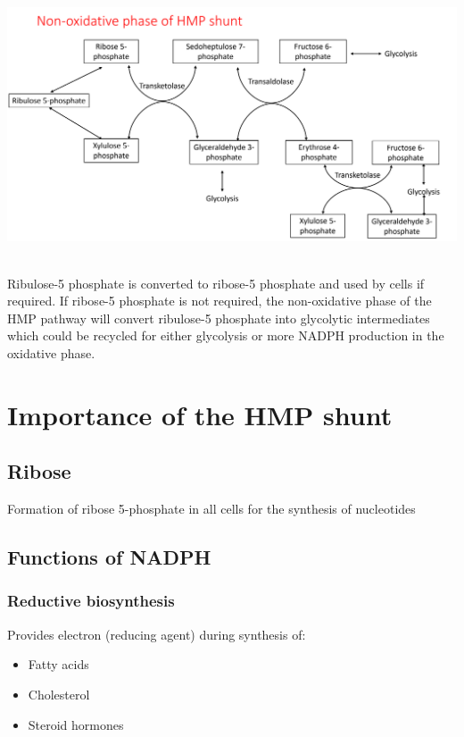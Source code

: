 \documentclass[
]{book}
\providecommand{\tightlist}{%
  \setlength{\itemsep}{0pt}\setlength{\parskip}{0pt}}
\begin{document}
\includegraphics[width=\textwidth,height=3.125in]{Images/hmp2.png}

Ribulose-5 phosphate is converted to ribose-5 phosphate and used by cells if required. If ribose-5 phosphate is not required, the non-oxidative phase of the HMP pathway will convert ribulose-5 phosphate into glycolytic intermediates which could be recycled for either glycolysis or more NADPH production in the oxidative phase.

\section{Importance of the HMP shunt}\label{importance-of-the-hmp-shunt}

\subsection{Ribose}\label{ribose}

Formation of ribose 5-phosphate in all cells for the synthesis of nucleotides

\subsection{Functions of NADPH}\label{functions-of-nadph}

\subsubsection{Reductive biosynthesis}\label{reductive-biosynthesis}

Provides electron (reducing agent) during synthesis of:

\begin{itemize}
\tightlist
\item
  Fatty acids
\item
  Cholesterol
\item
  Steroid hormones
\end{itemize}
\end{document}
